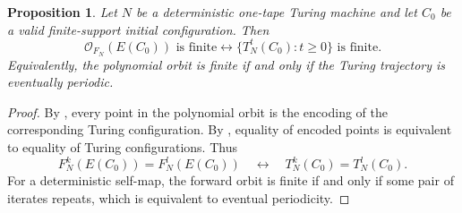 \documentclass[10pt,a4paper]{amsart}
\newtheorem{proposition}{Proposition}
\begin{document}
\begin{proposition}\label{prop_ofrt}
Let $N$ be a deterministic one-tape Turing machine and let $C_0$ be a valid finite-support initial configuration.
Then
\[\mathcal{O}_{F_N}(E(C_0))\text{ is finite}\longleftrightarrow\{T^t_N(C_0):t\ge0\}\text{ is finite.}\]
Equivalently, the polynomial orbit is finite if and only if the Turing trajectory is eventually periodic.
\end{proposition}

\begin{proof}
By , every point in the polynomial orbit is the encoding of the corresponding Turing configuration.
By , equality of encoded points is equivalent to equality of Turing configurations.
Thus
\[F^k_N(E(C_0))=F^l_N(E(C_0))\quad\longleftrightarrow\quad T^k_N(C_0)=T^l_N(C_0).\]
For a deterministic self-map, the forward orbit is finite if and only if some pair of iterates repeats, which is equivalent to eventual periodicity.
\end{proof}
\end{document}
